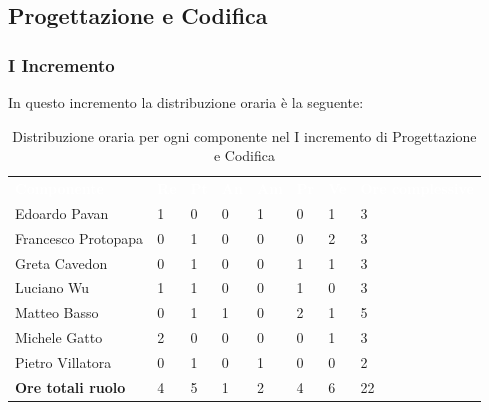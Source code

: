 \subsection{Progettazione e Codifica}

\subsubsection{I Incremento}
In questo incremento la distribuzione oraria è la seguente:
\begin{table}[H]
\begin{center}
\renewcommand{\arraystretch}{1.25}
\begin{tabular}{ m{}<{\centering}  m{}<{\centering} m{}<{\centering} m{}<{\centering}  m{}<{\centering}  m{}<{\centering}  m{}<{\centering}  m{}<{\centering}   }
	\rowcolor{darkblue}
	\textcolor{white}{\textbf{Componente}} &\textcolor{white}{\textbf{Re}}&\textcolor{white}{\textbf{Pt}}&\textcolor{white}{\textbf{An}}&\textcolor{white}{\textbf{Am}}&\textcolor{white}{\textbf{Pr}}&\textcolor{white}{\textbf{Ve}}&\textcolor{white}{\textbf{Ore complessive}}\\ 
	Edoardo Pavan & 1 & 0 & 0 & 1 & 0 & 1 & 3 \\	
	
	Francesco Protopapa & 0 & 1 & 0 & 0 & 0 & 2 & 3 \\

	Greta Cavedon & 0 & 1 & 0 & 0 & 1 & 1 & 3 \\
	
	Luciano Wu & 1 & 1 & 0 & 0 & 1 & 0 & 3 \\
	
	Matteo Basso & 0 & 1 & 1 & 0 & 2 & 1 & 5 \\
	
	Michele Gatto & 2 & 0 & 0 & 0 & 0 & 1 & 3 \\
	
	Pietro Villatora & 0 & 1 & 0 & 1 & 0 & 0 & 2 \\
	
	\textbf{Ore totali ruolo} & 4 & 5 & 1 & 2 & 4 & 6 & 22 \\

\end{tabular}
\caption{Distribuzione oraria per ogni componente nel I incremento di Progettazione e Codifica}
\end{center}
\end{table}


